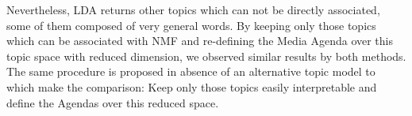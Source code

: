\documentclass{bmcart}
\begin{document}
\par Nevertheless, LDA returns other topics which can not be directly associated, some of them composed of very general words. 
By keeping only those topics which can be associated with NMF and re-defining the Media Agenda over this topic space with reduced dimension, we observed similar results by both methods.  
The same procedure is proposed in absence of an alternative topic model to which make the comparison: Keep only those topics easily interpretable and define the Agendas over this reduced space.
 


\end{document}

